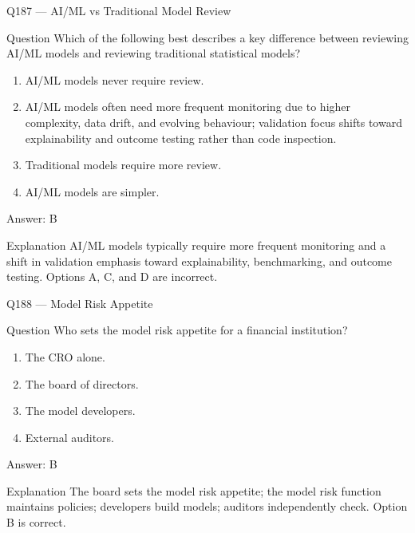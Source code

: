 \documentclass[aspectratio=169,8pt]{beamer}
\begin{document}
\begin{frame}{Q187 --- AI/ML vs Traditional Model Review}
\begin{block}{Question}
Which of the following best describes a key difference between reviewing AI/ML models and reviewing traditional statistical models?
\begin{enumerate}
\item AI/ML models never require review.
\item AI/ML models often need more frequent monitoring due to higher complexity, data drift, and evolving behaviour; validation focus shifts toward explainability and outcome testing rather than code inspection.
\item Traditional models require more review.
\item AI/ML models are simpler.
\end{enumerate}  \end{block}
\begin{exampleblock}{Answer: B}\end{exampleblock}
\begin{block}{Explanation}
AI/ML models typically require more frequent monitoring and a shift in validation emphasis toward explainability, benchmarking, and outcome testing. Options A, C, and D are incorrect.
\end{block}
\end{frame}

\begin{frame}{Q188 --- Model Risk Appetite}
\begin{block}{Question}
Who sets the model risk appetite for a financial institution?
\begin{enumerate}
\item The CRO alone.
\item The board of directors.
\item The model developers.
\item External auditors.
\end{enumerate}  \end{block}
\begin{exampleblock}{Answer: B}\end{exampleblock}
\begin{block}{Explanation}
The board sets the model risk appetite; the model risk function maintains policies; developers build models; auditors independently check. Option B is correct.
\end{block}
\end{frame}
\end{document}
